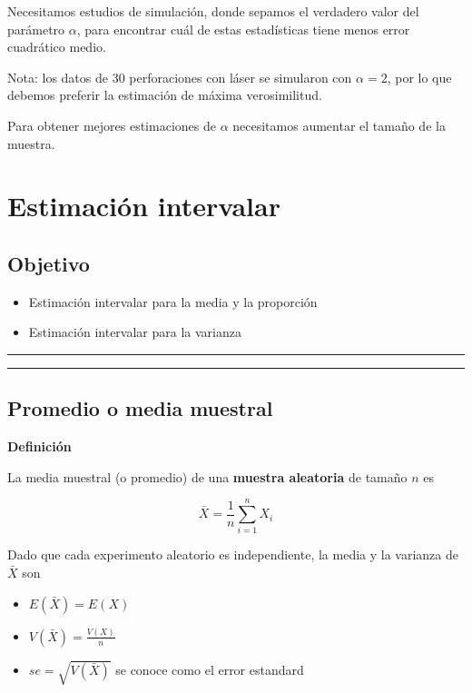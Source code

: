\documentclass[
]{book}
\providecommand{\tightlist}{%
  \setlength{\itemsep}{0pt}\setlength{\parskip}{0pt}}
\begin{document}
Necesitamos estudios de simulación, donde sepamos el verdadero valor del parámetro \(\alpha\), para encontrar cuál de estas estadísticas tiene menos error cuadrático medio.

Nota: los datos de 30 perforaciones con láser se simularon con \(\alpha=2\), por lo que debemos preferir la estimación de máxima verosimilitud.

Para obtener mejores estimaciones de \(\alpha\) necesitamos aumentar el tamaño de la muestra.

\hypertarget{estimaciuxf3n-intervalar}{%
\chapter{Estimación intervalar}\label{estimaciuxf3n-intervalar}}

\hypertarget{objetivo-12}{%
\section{Objetivo}\label{objetivo-12}}

\begin{itemize}
\tightlist
\item
  Estimación intervalar para la media y la proporción
\item
  Estimación intervalar para la varianza
\end{itemize}

\begin{center}\rule{0.5\linewidth}{0.5pt}\end{center}

\begin{center}\rule{0.5\linewidth}{0.5pt}\end{center}

\hypertarget{promedio-o-media-muestral-1}{%
\section{Promedio o media muestral}\label{promedio-o-media-muestral-1}}

\textbf{Definición}

La media muestral (o promedio) de una \textbf{muestra aleatoria} de tamaño \(n\) es

\[\bar{X}=\frac{1}{n}\sum_{i=1}^n X_i\]

Dado que cada experimento aleatorio es independiente, la media y la varianza de \(\bar{X}\) son

\begin{itemize}
\tightlist
\item
  \(E(\bar{X})=E(X)\)
\item
  \(V(\bar{X})=\frac{V(X)}{n}\)
\item
  \(se=\sqrt{V(\bar{X})}\) se conoce como el error estandard
\end{itemize}
\end{document}

